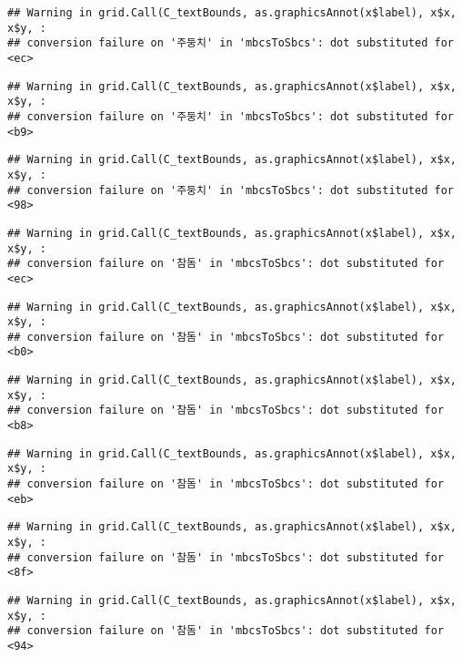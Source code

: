 \documentclass[
]{article}
\begin{document}
\begin{verbatim}
## Warning in grid.Call(C_textBounds, as.graphicsAnnot(x$label), x$x, x$y, :
## conversion failure on '주둥치' in 'mbcsToSbcs': dot substituted for <ec>
\end{verbatim}

\begin{verbatim}
## Warning in grid.Call(C_textBounds, as.graphicsAnnot(x$label), x$x, x$y, :
## conversion failure on '주둥치' in 'mbcsToSbcs': dot substituted for <b9>
\end{verbatim}

\begin{verbatim}
## Warning in grid.Call(C_textBounds, as.graphicsAnnot(x$label), x$x, x$y, :
## conversion failure on '주둥치' in 'mbcsToSbcs': dot substituted for <98>
\end{verbatim}

\begin{verbatim}
## Warning in grid.Call(C_textBounds, as.graphicsAnnot(x$label), x$x, x$y, :
## conversion failure on '참돔' in 'mbcsToSbcs': dot substituted for <ec>
\end{verbatim}

\begin{verbatim}
## Warning in grid.Call(C_textBounds, as.graphicsAnnot(x$label), x$x, x$y, :
## conversion failure on '참돔' in 'mbcsToSbcs': dot substituted for <b0>
\end{verbatim}

\begin{verbatim}
## Warning in grid.Call(C_textBounds, as.graphicsAnnot(x$label), x$x, x$y, :
## conversion failure on '참돔' in 'mbcsToSbcs': dot substituted for <b8>
\end{verbatim}

\begin{verbatim}
## Warning in grid.Call(C_textBounds, as.graphicsAnnot(x$label), x$x, x$y, :
## conversion failure on '참돔' in 'mbcsToSbcs': dot substituted for <eb>
\end{verbatim}

\begin{verbatim}
## Warning in grid.Call(C_textBounds, as.graphicsAnnot(x$label), x$x, x$y, :
## conversion failure on '참돔' in 'mbcsToSbcs': dot substituted for <8f>
\end{verbatim}

\begin{verbatim}
## Warning in grid.Call(C_textBounds, as.graphicsAnnot(x$label), x$x, x$y, :
## conversion failure on '참돔' in 'mbcsToSbcs': dot substituted for <94>
\end{verbatim}
\end{document}

